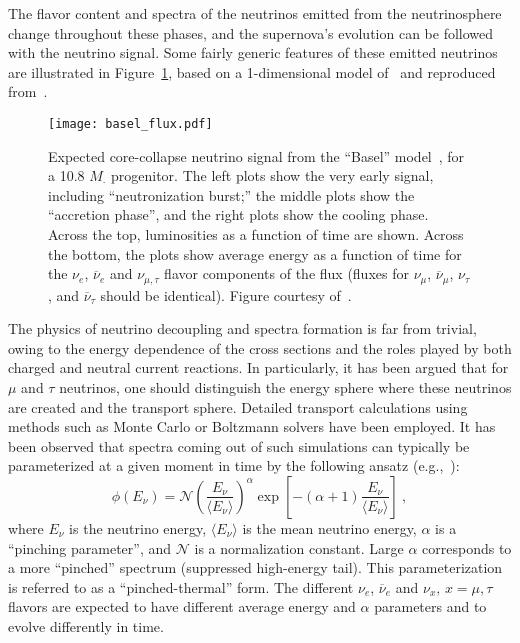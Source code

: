 The flavor content and spectra of the neutrinos emitted from the neutrinosphere change
throughout these phases, and the supernova's evolution can
be followed with the neutrino signal. %
Some fairly generic features of these emitted neutrinos are illustrated in Figure~\ref{fig:spectrum}, based on a 1-dimensional model of~\cite{Fischer:2009af} and reproduced from~\cite{Wurm:2011zn}.
%
\begin{figure}[!htb]
\centering
\texttt{[image: basel\_flux.pdf]}
\caption[Expected core-collapse neutrino signal]{Expected
  core-collapse neutrino signal from the ``Basel''
  model~\cite{Fischer:2009af}, for a
  10.8 $M_{\cdot}$ progenitor.  The left plots show the very early
  signal, including ``neutronization burst;'' the middle plots show
  the ``accretion phase'', and the right plots show the cooling
  phase. Across the top, luminosities as a function of time are shown. 
  Across the bottom, the plots show average energy as a function of time for the
  $\nu_e$, $\overline{\nu}_e$ and $\nu_{\mu,\tau}$ flavor components of the
  flux (fluxes for $\nu_\mu$, $\overline{\nu}_\mu$, $\nu_\tau$,
  and $\overline{\nu}_\tau$ should be identical).  Figure courtesy of~\cite{Wurm:2011zn}.}
\label{fig:spectrum}
\end{figure}

The physics of neutrino decoupling and spectra formation is far from trivial, owing to the energy dependence of the cross sections and the roles played by both charged and neutral current reactions. In particularly, it has been argued that for $\mu$ and $\tau$ neutrinos, one should distinguish the energy sphere where these neutrinos are created and the transport sphere. Detailed transport calculations using methods such as Monte Carlo or Boltzmann solvers have been employed. It has been observed that spectra coming out of such simulations can typically be parameterized at a given moment in time by the following ansatz (e.g.,~\cite{Minakata:2008nc,Tamborra:2012ac}):
\begin{equation}
        \label{eq:pinched}
        \phi(E_{\nu}) = \mathcal{N} 
        \left(\frac{E_{\nu}}{\langle E_{\nu} \rangle}\right)^{\alpha} \exp\left[-\left(\alpha + 1\right)\frac{E_{\nu}}{\langle E_{\nu} \rangle}\right] \ ,
\end{equation}
where $E_{\nu}$ is the neutrino energy, $\langle E_\nu \rangle$ is the
mean neutrino energy, $\alpha$ is a ``pinching parameter'', and
$\mathcal{N}$ is a normalization constant.
%
Large $\alpha$ corresponds to a more ``pinched'' spectrum (suppressed
high-energy tail). This parameterization is referred to as a
``pinched-thermal'' form. The different $\nu_e$, $\overline{\nu}_e$ and
$\nu_x, \, x = \mu, \tau$ flavors are expected to have different
average energy and $\alpha$ parameters and to evolve differently in
time. 

